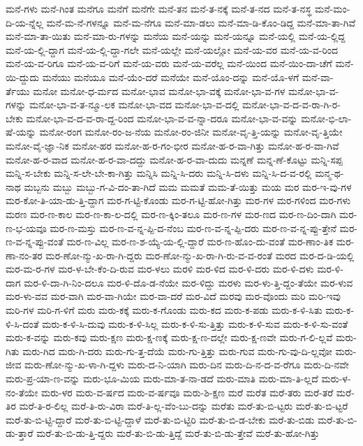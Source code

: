 {ಮನೆ-ಗಳು
ಮನೆ-ಗಿಂತ
ಮನೆಗೂ
ಮನೆಗೆ
ಮನೆಗೇ
ಮನೆ-ತನ
ಮನೆ-ತ-ನಕ್ಕೆ
ಮನೆ-ತ-ನದ
ಮನೆ-ತ-ನಸ್ಥ
ಮನೆ-ಮಂ-ದಿ-ಯ-ನ್ನೆಲ್ಲ
ಮನೆ-ಮ-ನೆ-ಗಳನ್ನೂ
ಮನೆ-ಮ-ನೆಗೂ
ಮನೆ-ಮಾ-ಡಲು
ಮನೆ-ಮಾ-ಡಿ-ಕೊಂ-ಡಿದ್ದ
ಮನೆ-ಮಾ-ತಾ-ಗಿವೆ
ಮನೆ-ಮಾ-ತಾ-ಯಿತು
ಮನೆ-ಮಾ-ರು-ಗಳನ್ನು
ಮನೆಯ
ಮನೆ-ಯನ್ನು
ಮನೆ-ಯನ್ನೂ
ಮನೆ-ಯಲ್ಲಿ
ಮನೆ-ಯ-ಲ್ಲಿದ್ದ
ಮನೆ-ಯ-ಲ್ಲಿ-ದ್ದಾಗ
ಮನೆ-ಯ-ಲ್ಲಿ-ದ್ದಾ-ಗಲೇ
ಮನೆ-ಯಲ್ಲೇ
ಮನೆ-ಯಲ್ಲೋ
ಮನೆ-ಯ-ವರ
ಮನೆ-ಯ-ವ-ರಿಂದ
ಮನೆ-ಯ-ವ-ರಿಗೂ
ಮನೆ-ಯ-ವ-ರಿಗೆ
ಮನೆ-ಯ-ವರು
ಮನೆ-ಯ-ವರೆಲ್ಲ
ಮನೆ-ಯಿಂದ
ಮನೆ-ಯಿಂ-ದಾ-ಚೆಗೆ
ಮನೆ-ಯಿ-ದ್ದುದು
ಮನೆಯು
ಮನೆಯೂ
ಮನೆ-ಯೆಂ-ದರೆ
ಮನೆಯೇ
ಮನೆ-ಯೊಂ-ದನ್ನು
ಮನೆ-ಯೊ-ಳಗೆ
ಮನೆ-ವಾ-ರ್ತೆಯು
ಮನೋ
ಮನೋ-ಧ-ರ್ಮದ
ಮನೋ-ಭಾವ
ಮನೋ-ಭಾ-ವಕ್ಕೆ
ಮನೋ-ಭಾ-ವ-ಗಳ
ಮನೋ-ಭಾ-ವ-ಗಳನ್ನು
ಮನೋ-ಭಾ-ವ-ತ-ನ್ಮೂ-ಲಕ
ಮನೋ-ಭಾ-ವದ
ಮನೋ-ಭಾ-ವ-ದಲ್ಲಿ
ಮನೋ-ಭಾ-ವ-ದ-ವ-ರಾ-ಗಿ-ರ-ಬೇಕು
ಮನೋ-ಭಾ-ವ-ದ-ವ-ರಾ-ದ್ದ-ರಿಂದ
ಮನೋ-ಭಾ-ವ-ವ-ನ್ನಾ-ದರೂ
ಮನೋ-ಭಾ-ವ-ವನ್ನು
ಮನೋ-ಭಿ-ಲಾ-ಷೆ-ಯನ್ನು
ಮನೋ-ರಂಗ
ಮನೋ-ರಂ-ಜ-ನೆಯ
ಮನೋ-ರಂ-ಜಿನೀ
ಮನೋ-ವೃ-ತ್ತಿ-ಯನ್ನು
ಮನೋ-ವೃ-ತ್ತಿಯೇ
ಮನೋ-ವೈ-ಜ್ಞಾ-ನಿಕ
ಮನೋ-ಹರ
ಮನೋ-ಹ-ರ-ಗಂ-ಭೀರ
ಮನೋ-ಹ-ರ-ವಾ-ಗಿತ್ತು
ಮನೋ-ಹ-ರ-ವಾ-ಗಿವೆ
ಮನೋ-ಹ-ರ-ವಾದ
ಮನೋ-ಹ-ರ-ವಾ-ದದ್ದು
ಮನೋ-ಹ-ರ-ವಾ-ದುದು
ಮನ್ನಣೆ
ಮನ್ನ-ಣೆ-ಕೊಟ್ಟು
ಮನ್ನಿ-ಸಪ್ಪ
ಮನ್ನಿ-ಸ-ಬೇಕು
ಮನ್ನಿ-ಸ-ಲೇ-ಬೇ-ಕಾ-ಗಿತ್ತು
ಮನ್ನಿಸಿ
ಮನ್ನಿ-ಸಿ-ದರು
ಮನ್ನಿ-ಸಿ-ದಳು
ಮನ್ನಿ-ಸಿ-ದ-ವ-ರಲ್ಲಿ
ಮನ್ಮ-ಥ-ನಾಥ
ಮಬ್ಬನು
ಮಬ್ಬು
ಮಬ್ಬು-ಗ-ವಿ-ದಂ-ತಾ-ಗಿದೆ
ಮಮ
ಮಮತೆ
ಮಮ-ತೆ-ಯಿತ್ತು
ಮಯ
ಮರ
ಮರ-ಇ-ವು-ಗಳ
ಮರ-ಕೋ-ತಿ-ಯಾ-ಡು-ತ್ತಿ-ದ್ದಾಗ
ಮರ-ಗ-ಟ್ಟಿ-ಕೊಂಡು
ಮರ-ಗ-ಟ್ಟಿ-ಹೋ-ಗಿತ್ತು
ಮರ-ಗಳ
ಮರ-ಗಳಿಂದ
ಮರ-ಗಳು
ಮರಣ
ಮರ-ಣ-ಕಾಲ
ಮರ-ಣ-ಕಾ-ಲ-ದಲ್ಲಿ
ಮರ-ಣ-ಕ್ಕಿಂ-ತಲೂ
ಮರ-ಣ-ಗಳ
ಮರ-ಣದ
ಮರ-ಣ-ದಿಂ-ದಾಗಿ
ಮರ-ಣ-ಭ-ಯವೂ
ಮರ-ಣ-ಮಸ್ತು
ಮರ-ಣ-ವ-ನ್ನ-ಪ್ಪಿ-ದ-ನೆಂಬ
ಮರ-ಣ-ವ-ನ್ನ-ಪ್ಪಿ-ದರು
ಮರ-ಣ-ವ-ನ್ನ-ಪ್ಪು-ತ್ತೇನೆ
ಮರ-ಣ-ವ-ನ್ನ-ಪ್ಪು-ವಂತೆ
ಮರ-ಣ-ವಿಲ್ಲ
ಮರ-ಣ-ಶ-ಯ್ಯೆ-ಯ-ಲ್ಲಿ-ದ್ದಾರೆ
ಮರ-ಣ-ಹೊಂ-ದು-ವಂತೆ
ಮರ-ಣಾಂ-ತಿಕ
ಮರ-ಣಾ-ನಂ-ತರ
ಮರ-ಣೋ-ನ್ಮು-ಖ-ರಾ-ಗಿ-ದ್ದರು
ಮರ-ಣೋ-ನ್ಮು-ಖ-ರಾ-ಗಿ-ರು-ವ-ವ-ರಂತೆ
ಮರದ
ಮರ-ದ-ಡಿ-ಯಲ್ಲಿ
ಮರ-ಮ-ರ-ಗಳ
ಮರ-ಳ-ಬೇ-ಕೆಂ-ದಿ-ರುವ
ಮರ-ಳಲು
ಮರಳಿ
ಮರ-ಳಿದ
ಮರ-ಳಿ-ದರು
ಮರ-ಳಿ-ದಳು
ಮರ-ಳಿ-ದಾಗ
ಮರ-ಳಿ-ದಾ-ಗಿ-ನಿಂ-ದಲೂ
ಮರ-ಳಿ-ದೊ-ಡ-ನೆಯೇ
ಮರ-ಳಿದ್ದು
ಮರಳು
ಮರ-ಳು-ತ್ತಿ-ದ್ದಂ-ತೆಯೇ
ಮರ-ಳುವ
ಮರ-ಳು-ವವ
ಮರ-ವಾಗಿ
ಮರ-ವಾ-ಗಿಯೇ
ಮರ-ವಾ-ದರೆ
ಮರ-ವಿದೆ
ಮರವು
ಮರ-ವೊಂದು
ಮರಿ
ಮರಿ-ಇವು
ಮರಿ-ಗಳ
ಮರಿ-ಗ-ಳಿಗೆ
ಮರು
ಮರು-ಕಕ್ಕೆ
ಮರು-ಕ-ಗೊಂಡು
ಮರು-ಕದ
ಮರು-ಕ-ಪಡು
ಮರು-ಕ-ಳಿ-ಸಿತು
ಮರು-ಕ-ಳಿ-ಸಿ-ದಂತೆ
ಮರು-ಕ-ಳಿ-ಸಿ-ದುವು
ಮರು-ಕ-ಳಿ-ಸಿಲ್ಲ
ಮರು-ಕ-ಳಿ-ಸು-ತ್ತಿತ್ತು
ಮರು-ಕ-ಳಿ-ಸುವ
ಮರು-ಕ-ಳಿ-ಸು-ವಂತೆ
ಮರು-ಕ-ವನ್ನು
ಮರು-ಕವು
ಮರು-ಕ್ಷಣ
ಮರು-ಕ್ಷ-ಣಕ್ಕೆ
ಮರು-ಕ್ಷ-ಣ-ದಲ್ಲೇ
ಮರು-ಕ್ಷ-ಣವೇ
ಮರು-ಗ-ಲಿ-ಲ್ಲವೆ
ಮರು-ಗಿತು
ಮರು-ಗಿದ
ಮರು-ಗಿ-ದರು
ಮರು-ಗು-ತ್ತ-ದೆಯೆ
ಮರು-ಗು-ತ್ತಿತ್ತು
ಮರು-ಗುವ
ಮರು-ಗು-ವು-ದಿ-ಲ್ಲವೋ
ಮರು-ಜೀವ
ಮರು-ಣೋ-ನ್ಮು-ಖ-ಳಾ-ಗಿ-ದ್ದಳು
ಮರು-ದ-ನಿ-ಯಾಗಿ
ಮರು-ದಿನ
ಮರು-ದಿ-ನ-ದ-ವ-ರೆಗೂ
ಮರು-ದಿ-ನವೇ
ಮರು-ಪ್ರ-ಯಾ-ಣ-ವನ್ನು
ಮರು-ಭೂ-ಮಿಯ
ಮರು-ಮಾ-ತ-ನಾ-ಡದೆ
ಮರು-ಮಾತಿ
ಮರು-ಮಾ-ತಿ-ಲ್ಲದೆ
ಮರು-ಳ-ನಂ-ತೆಯೇ
ಮರು-ಳರ
ಮರು-ವ-ರ್ಷದ
ಮರು-ವ-ರ್ಷವೂ
ಮರು-ಶಿ-ಕ್ಷಣ
ಮರೆ
ಮರೆತ
ಮರೆ-ತರು
ಮರೆ-ತರೆ
ಮರೆ-ತಿರ
ಮರೆ-ತಿ-ರ-ಲಿಲ್ಲ
ಮರೆ-ತಿ-ರು-ವಿರಾ
ಮರೆ-ತಿ-ಲ್ಲ-ವೆಂ-ಬು-ದನ್ನು
ಮರೆತು
ಮರೆ-ತು-ಬಿ-ಟ್ಟರು
ಮರೆ-ತು-ಬಿ-ಟ್ಟರೆ
ಮರೆ-ತು-ಬಿ-ಟ್ಟಿ-ದ್ದಾರೆ
ಮರೆ-ತು-ಬಿ-ಟ್ಟಿ-ದ್ದಾಳೆ
ಮರೆ-ತು-ಬಿ-ಟ್ಟಿರಿ
ಮರೆ-ತು-ಬಿ-ಡ-ಬೇಕು
ಮರೆ-ತು-ಬಿಡು
ಮರೆ-ತು-ಬಿ-ಡು-ತ್ತಾರೆ
ಮರೆ-ತು-ಬಿ-ಡು-ತ್ತಿ-ದ್ದರು
ಮರೆ-ತು-ಬಿ-ಡು-ತ್ತಿದ್ದೆ
ಮರೆ-ತು-ಬಿ-ಡು-ತ್ತೇವೆ
ಮರೆ-ತು-ಹೋ-ಗಿತ್ತು
}
